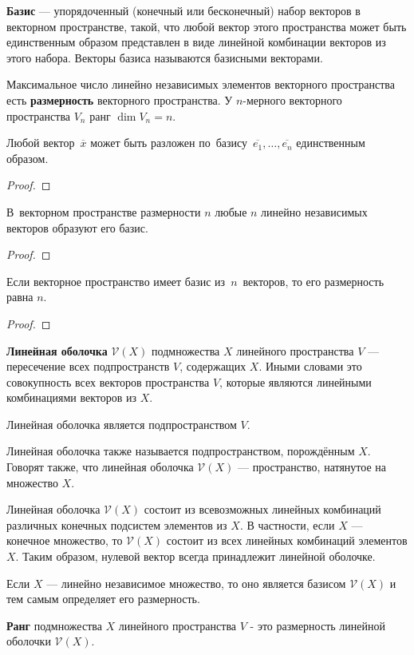 \textbf{Базис} — упорядоченный (конечный или бесконечный) набор векторов в векторном пространстве, такой, что любой вектор этого пространства может быть единственным образом представлен в виде линейной комбинации векторов из этого набора. Векторы базиса называются базисными векторами.

Максимальное число линейно независимых элементов векторного пространства есть \textbf{размерность} векторного пространства. У $n$-мерного векторного пространства $V_n$ ранг $\dim V_n = n$.


\begin{theorem}[о базисе]
	Любой вектор~$\overline x$ может быть разложен по~базису~$\overline{e_1}, \ldots, \overline{e_n}$ единственным образом.
\end{theorem}
\begin{proof}
	
\end{proof}

\begin{theorem}
	В~векторном пространстве размерности $n$ любые $n$ линейно независимых векторов образуют его базис.
\end{theorem}
\begin{proof}
	
\end{proof}

\begin{theorem}
	Если векторное пространство имеет базис из~$n$~векторов, то его размерность равна $n$.
\end{theorem}
\begin{proof}
	
\end{proof}

\textbf{Линейная оболочка} $\mathcal{V}(X)$ подмножества $X$ линейного пространства $V$ — пересечение всех подпространств $V$, содержащих $X$. Иными словами это совокупность всех векторов пространства $V$, которые являются линейными комбинациями векторов из $X$.

Линейная оболочка является подпространством $V$.

Линейная оболочка также называется подпространством, порождённым $X$. Говорят также, что линейная оболочка $\mathcal{V}(X)$ — пространство, натянутое на множество $X$.

Линейная оболочка $\mathcal{V}(X)$ состоит из всевозможных линейных комбинаций различных конечных подсистем элементов из $X$. В частности, если $X$ — конечное множество, то $\mathcal{V}(X)$ состоит из всех линейных комбинаций элементов $X$. Таким образом, нулевой вектор всегда принадлежит линейной оболочке.

Если $X$ — линейно независимое множество, то оно является базисом $\mathcal{V}(X)$ и тем самым определяет его размерность.

\textbf{Ранг} подмножества $X$ линейного пространства $V$ - это размерность линейной оболочки $\mathcal{V}(X)$.